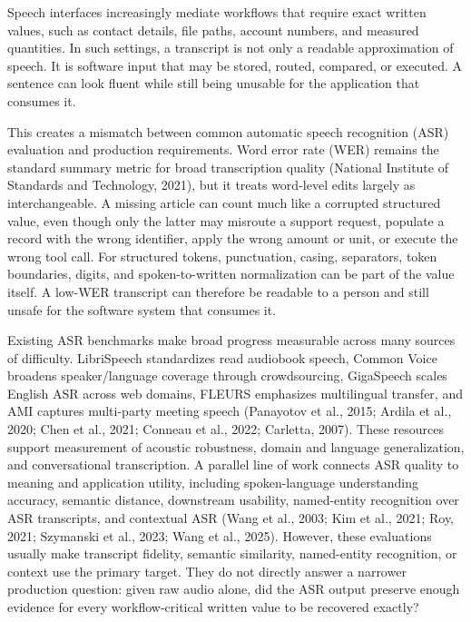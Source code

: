 \documentclass[10pt,twocolumn]{article}
\begin{document}
Speech interfaces increasingly mediate workflows that require exact
written values, such as contact details, file paths, account numbers,
and measured quantities. In such settings, a transcript is not only a
readable approximation of speech. It is software input that may be
stored, routed, compared, or executed. A sentence can look fluent while
still being unusable for the application that consumes it.

This creates a mismatch between common automatic speech recognition
(ASR) evaluation and production requirements. Word error rate (WER)
remains the standard summary metric for broad transcription quality
(National Institute of Standards and Technology, 2021), but it treats
word-level edits largely as interchangeable. A missing article can
count much like a corrupted structured value, even though only the latter
may misroute a support request, populate a record with the wrong
identifier, apply the wrong amount or unit, or execute the wrong tool
call. For structured tokens, punctuation, casing, separators,
token boundaries, digits, and spoken-to-written normalization can be part
of the value itself. A low-WER transcript can therefore be readable to a
person and still unsafe for the software system that consumes it.

Existing ASR benchmarks make broad progress measurable across many
sources of difficulty. LibriSpeech standardizes read audiobook speech,
Common Voice broadens speaker/language coverage through crowdsourcing,
GigaSpeech scales English ASR across web domains, FLEURS emphasizes
multilingual transfer, and AMI captures multi-party meeting speech
(Panayotov et al., 2015; Ardila et al., 2020; Chen et al., 2021;
Conneau et al., 2022; Carletta, 2007). These resources support
measurement of acoustic robustness, domain and language generalization,
and conversational transcription. A parallel line of work connects ASR
quality to meaning and application utility, including
spoken-language understanding accuracy, semantic distance, downstream
usability, named-entity recognition over ASR transcripts, and contextual
ASR (Wang et al., 2003; Kim et al., 2021; Roy, 2021; Szymanski et al.,
2023; Wang et al., 2025). However, these evaluations usually make
transcript fidelity, semantic similarity, named-entity recognition, or
context use the primary target. They do not directly answer a narrower
production question: given raw audio alone, did the ASR output preserve
enough evidence for every workflow-critical written value to be recovered
exactly?
\end{document}

